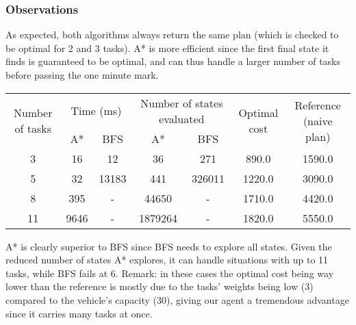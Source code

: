 \documentclass[11pt]{article}
\begin{document}
\subsubsection{Observations}
As expected, both algorithms always return the same plan (which is checked to be
optimal for 2 and 3 tasks). A* is more efficient since the first final state it
finds is guaranteed to be optimal, and can thus handle a larger number of tasks
before passing the one minute mark.

\vspace{0.1in}
\begin{tabular}{|c|c|c|c|c|c|c|}
\hline
\multirow{2}{*}{Number of tasks} & \multicolumn{2}{c|}{Time (ms)} & \multicolumn{2}{c|}{Number of states evaluated} & \multirow{2}{*}{Optimal cost} & \multirow{2}{*}{Reference (naive plan)} \\ \cline{2-5}
                                 & A*          & BFS         & A*           & BFS          &                               &                                 \\ \hline
3                                &        16     &   12          &     36         &        271      &                              890.0 &      1590.0                           \\ \hline
5                                &     32        &     13183        &       441       &     326011         &                              1220.0 &               3090.0                  \\ \hline
8 &       395            &       -       &   44650 &  - &  1710.0 & 4420.0                          \\ \hline
11                                &       9646      &      -       &        1879264      &       -       &                              1820.0 &           5550.0                      \\ \hline
\end{tabular}
\vspace{0.1in}

A* is clearly superior to BFS since BFS needs to explore all states. Given the
reduced number of states A* explores, it can handle situations with up to 11
tasks, while BFS fails at 6. Remark: in these cases the optimal cost being way
lower than the reference is mostly due to the tasks' weights being low (3)
compared to the vehicle's capacity (30), giving our agent a tremendous advantage
since it carries many tasks at once.
\end{document}
